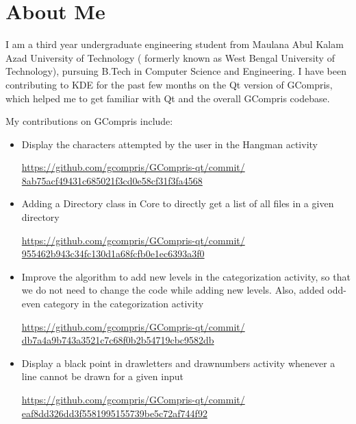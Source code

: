 \documentclass[preprint,12pt]{elsarticle}
\begin{document}
\section{About Me}
\label{S:1}

I am a third year undergraduate engineering student from Maulana Abul Kalam Azad University of Technology ( formerly known as West Bengal University of Technology), pursuing B.Tech in Computer Science and Engineering. I have been contributing to KDE for the past few months on the Qt version of GCompris, which helped me to get familiar with Qt and the overall GCompris codebase.

My contributions on GCompris include:

\begin{itemize}

\item Display the characters attempted by the user in the Hangman activity

\href{https://github.com/gcompris/GCompris-qt/commit/8ab75acf49431c685021f3cd0e58cf31f3fa4568}{https://github.com/gcompris/GCompris-qt/commit/\\8ab75acf49431c685021f3cd0e58cf31f3fa4568}

\item Adding a Directory class in Core to directly get a list of all files in a given directory

\href{https://github.com/gcompris/GCompris-qt/commit/955462b943c34fc130d1a68fcfb0e1ec6393a3f0}{https://github.com/gcompris/GCompris-qt/commit/\\955462b943c34fc130d1a68fcfb0e1ec6393a3f0}

\item Improve the algorithm to add new levels in the categorization activity, so that we do not need to change the code while adding new levels. Also, added odd-even category in the categorization activity

\href{https://github.com/gcompris/GCompris-qt/commit/db7a4a9b743a3521c7c68f0b2b54719cbc9582db}{https://github.com/gcompris/GCompris-qt/commit/\\db7a4a9b743a3521c7c68f0b2b54719cbc9582db}

\item Display a black point in drawletters and drawnumbers activity whenever a line cannot be drawn for a given input

\href{https://github.com/gcompris/GCompris-qt/commit/eaf8dd326dd3f5581995155739be5c72af744f92}{https://github.com/gcompris/GCompris-qt/commit/\\eaf8dd326dd3f5581995155739be5c72af744f92}


\end{itemize}
\end{document}
